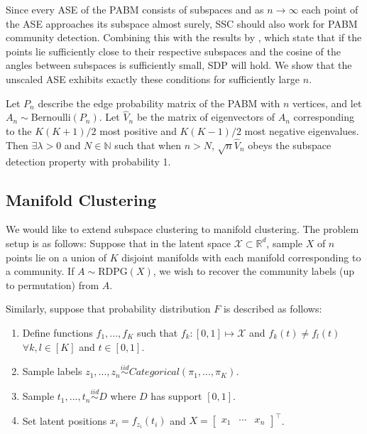 \documentclass[
  11pt,
]{article}
\providecommand{\tightlist}{%
  \setlength{\itemsep}{0pt}\setlength{\parskip}{0pt}}
\begin{document}
Since every ASE of the PABM consists of subspaces and as
\(n \to \infty\) each point of the ASE approaches its subspace almost
surely, SSC should also work for PABM community detection. Combining
this with the results by \citeauthor{jmlr-v28-wang13}, which state that
if the points lie sufficiently close to their respective subspaces and
the cosine of the angles between subspaces is sufficiently small, SDP
will hold. We show that the unscaled ASE exhibits exactly these
conditions for sufficiently large \(n\).

\begin{theorem}
\label{theorem5}
Let $P_n$ describe the edge probability matrix of the PABM with 
$n$ vertices, and let $A_n \sim \text{Bernoulli}(P_n)$.  Let $\hat{V}_n$ be the 
matrix of eigenvectors of $A_n$ corresponding to the $K (K + 1) / 2$ most
positive and $K (K - 1) / 2$ most negative eigenvalues. Then 
$\exists \lambda > 0$ and $N \in \mathbb{N}$ such that when $n > N$, 
$\sqrt{n} \hat{V}_n$ obeys the subspace detection property with probability 1.
\end{theorem}

\hypertarget{manifold-clustering}{%
\subsection{Manifold Clustering}\label{manifold-clustering}}

We would like to extend subspace clustering to manifold clustering. The
problem setup is as follows: Suppose that in the latent space
\(\mathcal{X} \subset \mathbb{R}^d\), sample \(X\) of \(n\) points lie
on a union of \(K\) disjoint manifolds with each manifold corresponding
to a community. If \(A \sim \text{RDPG}(X)\), we wish to recover the
community labels (up to permutation) from \(A\).

Similarly, suppose that probability distribution \(F\) is described as
follows:

\begin{enumerate}
\def\labelenumi{\arabic{enumi}.}
\tightlist
\item
  Define functions \(f_1, ..., f_K\) such that
  \(f_k : [0, 1] \mapsto \mathcal{X}\) and \(f_k(t) \neq f_l(t)\)
  \(\forall k, l \in [K]\) and \(t \in [0, 1]\).
\item
  Sample labels
  \(z_1, ..., z_n \stackrel{iid}{\sim} Categorical(\pi_1, ..., \pi_K)\).
\item
  Sample \(t_1, ..., t_n \stackrel{iid}{\sim} D\) where \(D\) has
  support \([0, 1]\).
\item
  Set latent positions \(x_i = f_{z_i}(t_i)\) and
  \(X = \begin{bmatrix} x_1 & \cdots & x_n \end{bmatrix}^\top\).
\end{enumerate}
\end{document}
